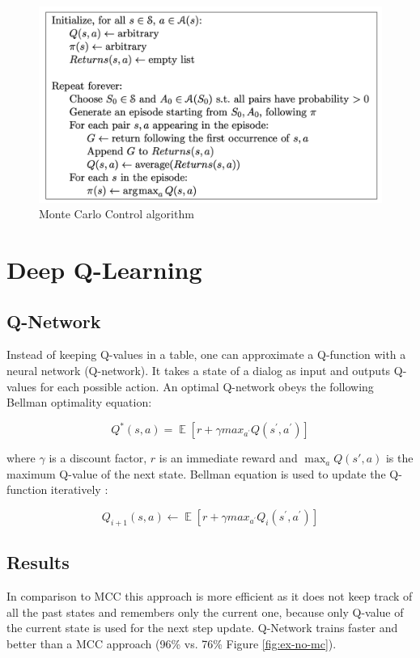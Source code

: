 \documentclass[12pt,titlepage,a4paper]{article}
\DeclareMathOperator*{\E}{\mathbb{E}}
\begin{document}
\begin{figure}[!h]
    \centering
    \includegraphics[width=12cm]{MCC.png}
    \caption{Monte Carlo Control algorithm \cite{Sutton1998}}
    \label{fig:MCC}
\end{figure}


\pagebreak
\section{Deep Q-Learning}

\subsection{Q-Network}
Instead of keeping Q-values in a table, one can approximate a Q-function with a neural network (Q-network). It takes a state of a dialog as input and outputs Q-values for each possible action. An optimal Q-network obeys the following Bellman optimality equation: 

\[ Q^*(s,a) = \E [r + \gamma max_{a^\prime}Q(s^\prime,a^\prime)] \] 

\noindent where $\gamma$ is a discount factor,  $r$ is an immediate reward and $\max_a Q(s',a)$ is the maximum Q-value of the next state. Bellman equation is used to update the Q-function iteratively \cite{DQN}:

\[Q_{i + 1} (s,a) \leftarrow \E[r + \gamma max_{a^\prime}Q_{i}(s^\prime,a^\prime)]\]

\subsection{Results}

In comparison to MCC this approach is more efficient as it does not keep track of all the past states and remembers only the current one, because only Q-value of the current state is used for the next step update. Q-Network trains faster and better than a MCC approach (96\% vs. 76\% Figure \ref{fig:ex-no-mc}). 
\end{document}
